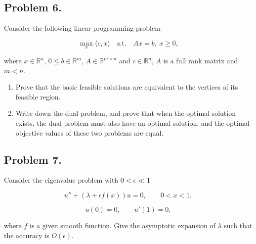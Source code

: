 \documentclass[11pt,a4paper]{article}
\begin{document}
\subsection{Problem 6.}
Consider the following linear programming problem

\[
\max_{x} \langle c, x \rangle \quad \text{s.t.} \quad Ax = b,\ x \ge 0,
\]

where \(x \in \mathbb{R}^{n}\), \(0 \le b \in \mathbb{R}^{m}\), \(A \in \mathbb{R}^{m \times n}\) and \(c \in \mathbb{R}^{n}\), \(A\) is a full rank matrix and \(m < n\).
\begin{enumerate}[label=(\arabic*)]
    \item Prove that the basic feasible solutions are equivalent to the vertices of its feasible region.
    \item Write down the dual problem, and prove that when the optimal solution exists, the dual problem must also have an optimal solution, and the optimal objective values of these two problems are equal.
\end{enumerate}

\subsection{Problem 7.}
Consider the eigenvalue problem with \(0 < \epsilon \ll 1\)

\[
u'' + (\lambda + \epsilon f(x)) u = 0, \qquad 0 < x < 1,
\]

\[
u(0) = 0, \qquad u'(1) = 0,
\]

where \(f\) is a given smooth function. Give the asymptotic expansion of \(\lambda\) such that the accuracy is \(O(\epsilon)\).
\end{document}
